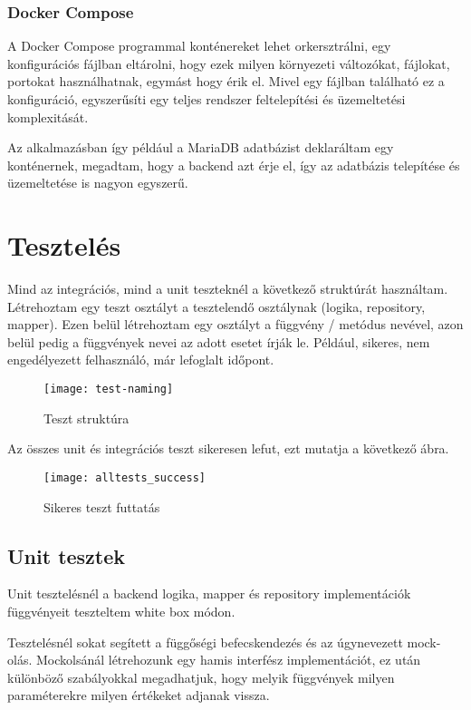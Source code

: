 \subsubsection{Docker Compose}

A Docker Compose programmal konténereket lehet orkersztrálni, egy konfigurációs fájlban eltárolni, hogy ezek milyen környezeti változókat, fájlokat, portokat használhatnak, egymást hogy érik el. Mivel egy fájlban található ez a konfiguráció, egyszerűsíti egy teljes rendszer feltelepítési és üzemeltetési komplexitását.

Az alkalmazásban így például a MariaDB adatbázist deklaráltam egy konténernek, megadtam, hogy a backend azt érje el, így az adatbázis telepítése és üzemeltetése is nagyon egyszerű.

\section{Tesztelés}

Mind az integrációs, mind a unit teszteknél a következő struktúrát használtam. Létrehoztam egy teszt osztályt a tesztelendő osztálynak (logika, repository, mapper). Ezen belül létrehoztam egy osztályt a függvény / metódus nevével, azon belül pedig a függvények nevei az adott esetet írják le. Például, sikeres, nem engedélyezett felhasználó, már lefoglalt időpont.

\begin{figure}[H]
	\centering
	\texttt{[image: test-naming]}
	\caption{Teszt struktúra}
\end{figure}

Az összes unit és integrációs teszt sikeresen lefut, ezt mutatja a következő ábra.

\begin{figure}[H]
	\centering
	\texttt{[image: alltests\_success]}
	\caption{Sikeres teszt futtatás}
\end{figure}

\subsection{Unit tesztek}
\label{sec:unittests}
Unit tesztelésnél a backend logika, mapper és repository implementációk függvényeit teszteltem white box módon.

Tesztelésnél sokat segített a függőségi befecskendezés és az úgynevezett mock-olás. Mockolsánál létrehozunk egy hamis interfész implementációt, ez után különböző szabályokkal megadhatjuk, hogy melyik függvények milyen paraméterekre milyen értékeket adjanak vissza.

